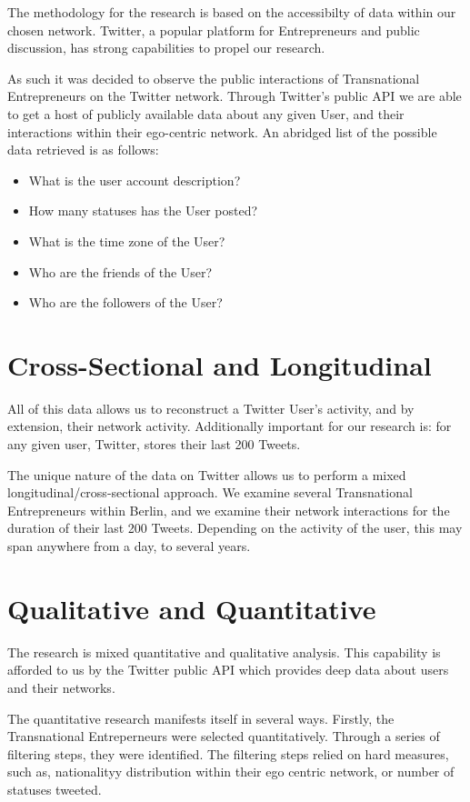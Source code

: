 The methodology for the research is based on the accessibilty of data
within our chosen network. Twitter, a popular platform for
Entrepreneurs and public discussion, has strong capabilities to propel
our research.

As such it was decided to observe the public interactions of
Transnational Entrepreneurs on the Twitter network. Through Twitter's
public API we are able to get a host of publicly available data about
any given User, and their interactions within their ego-centric
network. An abridged list of the possible data retrieved is as follows:

\begin{itemize}
\item What is the user account description?
\item How many statuses has the User posted?
\item What is the time zone of the User?
\item Who are the friends of the User?
\item Who are the followers of the User?
\end{itemize}

\section{Cross-Sectional and Longitudinal}
All of this data allows us to reconstruct a Twitter User's activity,
and by extension, their network activity. Additionally important for
our research is: for any given user, Twitter, stores their last
200 Tweets.

The unique nature of the data on Twitter allows us to perform a mixed
longitudinal/cross-sectional approach. We examine several
Transnational Entrepreneurs within Berlin, and we examine their
network interactions for the duration of their last 200
Tweets. Depending on the activity of the user, this may span anywhere
from a day, to several years.

\section{Qualitative and Quantitative}
The research is mixed quantitative and qualitative analysis. This
capability is afforded to us by the Twitter public API which provides
deep data about users and their networks.

The quantitative research manifests itself in several ways. Firstly,
the Transnational Entreperneurs were selected quantitatively. Through
a series of filtering steps, they were identified. The filtering steps
relied on hard measures, such as, nationalityy distribution within
their ego centric network, or number of statuses tweeted.

